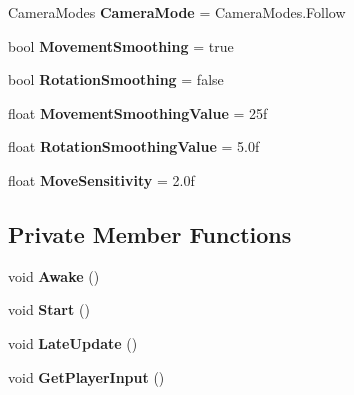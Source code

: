 \begin{DoxyCompactItemize}
\mbox{\label{class_t_m_pro_1_1_examples_1_1_camera_controller_a27513135088672400a14f64275a45190}} 
Camera\+Modes {\bfseries Camera\+Mode} = Camera\+Modes.\+Follow
\item 
\mbox{\label{class_t_m_pro_1_1_examples_1_1_camera_controller_a88aeb1dacfab4311497e12b63d9a0ead}} 
bool {\bfseries Movement\+Smoothing} = true
\item 
\mbox{\label{class_t_m_pro_1_1_examples_1_1_camera_controller_a3e2c0e89101934e95f27fa271ff05d14}} 
bool {\bfseries Rotation\+Smoothing} = false
\item 
\mbox{\label{class_t_m_pro_1_1_examples_1_1_camera_controller_add5727218e5af8bf5c4d50ecbc69eff2}} 
float {\bfseries Movement\+Smoothing\+Value} = 25f
\item 
\mbox{\label{class_t_m_pro_1_1_examples_1_1_camera_controller_a004e199cff2c8738cc9584087357444d}} 
float {\bfseries Rotation\+Smoothing\+Value} = 5.\+0f
\item 
\mbox{\label{class_t_m_pro_1_1_examples_1_1_camera_controller_af5ce7ae7b15ae2b86b4d7b4ad077d71a}} 
float {\bfseries Move\+Sensitivity} = 2.\+0f
\end{DoxyCompactItemize}
\subsection*{Private Member Functions}
\begin{DoxyCompactItemize}
\item 
\mbox{\label{class_t_m_pro_1_1_examples_1_1_camera_controller_ababc2f74b5580b96a5b15259eec5759a}} 
void {\bfseries Awake} ()
\item 
\mbox{\label{class_t_m_pro_1_1_examples_1_1_camera_controller_ae3e24286c2245dd641957f886af00335}} 
void {\bfseries Start} ()
\item 
\mbox{\label{class_t_m_pro_1_1_examples_1_1_camera_controller_a9f5da05c646aad22ad84d5f8fa4a135c}} 
void {\bfseries Late\+Update} ()
\item 
\mbox{\label{class_t_m_pro_1_1_examples_1_1_camera_controller_aee18ca227c7c36eef5c5c21e07f0473b}} 
void {\bfseries Get\+Player\+Input} ()
\end{DoxyCompactItemize}
